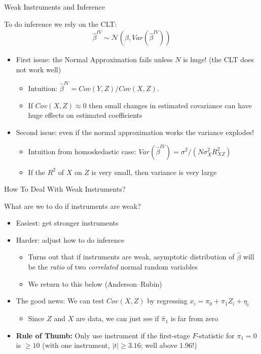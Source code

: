 \documentclass[aspectratio=169,11pt]{beamer}
\begin{document}
\begin{frame}{Weak Instruments and Inference}

To do inference we rely on the CLT:
\begin{align*}
	\hat\beta^{IV} \sim \mathcal{N}\left(\beta, Var\left(\hat\beta^{IV}\right)\right)
\end{align*}

\begin{itemize}
	\item First issue: the Normal Approximation fails unless $N$ is huge! (the CLT does not work well)
		\begin{itemize}
			\item Intuition: $\hat\beta^{IV} = Cov(Y,Z)/Cov(X,Z)$.
			\item If $Cov(X,Z)\approx 0$ then small changes in estimated covariance can have huge effects on estimated coefficients
		\end{itemize}
\medskip
	\item Second issue: even if the normal approximation works the variance explodes!
		\begin{itemize}
			\item Intuition from homoskedastic case: $Var(\hat\beta^{IV}) = \sigma^2/(N\sigma^2_XR^2_{XZ})$
			\item If the $R^2$ of $X$ on $Z$ is very small, then variance is very large
		\end{itemize}
\end{itemize}

\end{frame}

\begin{frame}{How To Deal With Weak Instruments?}

What are we to do if instruments are weak?

\begin{itemize}
		\item Easiest: get stronger instruments
\medskip
		\item Harder: adjust how to do inference
			\begin{itemize}
				\item Turns out that if instruments are weak, asymptotic distribution of $\hat\beta$ will be the \emph{ratio} of two \emph{correlated} normal random variables
				\item We return to this below (Anderson--Rubin)
			\end{itemize}
\medskip
		\item The good news: We can test $Cov(X,Z)$ by regressing $x_i=\pi_0 + \pi_1 Z_i + \eta_i$
			\begin{itemize}
				\item Since $Z$ and $X$ are data, we can just see if $\hat{\pi}_1$ is far from zero
			\end{itemize}
\medskip
\item \textbf{Rule of Thumb:} Only use instrument if the first-stage $F$-statistic for $\pi_1=0$ is $\geq 10$ (with one instrument, $|t|\geq 3.16$; well above 1.96!)

\end{itemize}
\end{frame}
\end{document}
